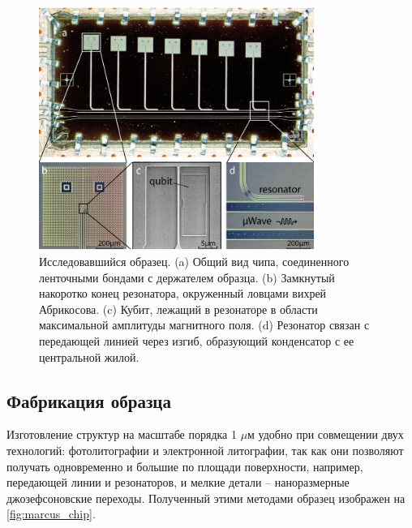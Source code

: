 \documentclass[12pt, twoside]{report}
\numberwithin{equation}{section}
\numberwithin{figure}{section}
\begin{document}
\begin{figure}[h]
\begingroup
\captionsetup{width = 0.9\textwidth, justification=normal}

\centering
\includegraphics[width=0.8\textwidth]{Pictures/marcus_chip}
\caption{Исследовавшийся образец\cite{Jerger2013}. (a) Общий вид чипа, соединенного ленточными бондами с держателем образца. (b) Замкнутый накоротко конец резонатора, окруженный ловцами вихрей Абрикосова. (c) Кубит, лежащий в резонаторе в области максимальной амплитуды магнитного поля. (d) Резонатор связан с передающей линией через изгиб, образующий конденсатор с ее центральной жилой.}
\label{fig:marcus_chip}
\endgroup
\end{figure}


\subsection{Фабрикация образца}

Изготовление структур на масштабе порядка 1 $\mu$м удобно при совмещении двух технологий: фотолитографии и электронной литографии, так как они позволяют получать одновременно и большие по площади поверхности, например, передающей линии и резонаторов, и мелкие детали -- наноразмерные джозефсоновские переходы. Полученный этими методами образец изображен на \autoref{fig:marcus_chip}.
\end{document}
